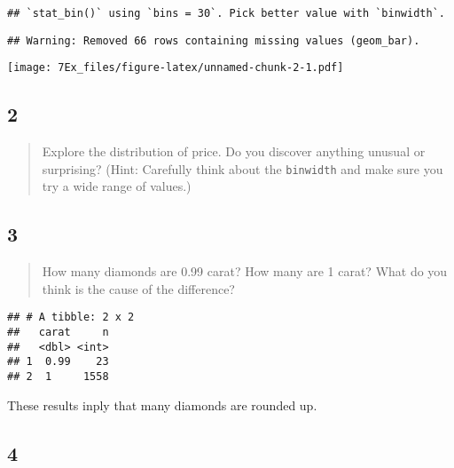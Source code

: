 \documentclass[]{article}
\newenvironment{Shaded}{\begin{snugshade}}{\end{snugshade}}
\newcommand{\DecValTok}[1]{\textcolor[rgb]{0.00,0.00,0.81}{#1}}
\newcommand{\FloatTok}[1]{\textcolor[rgb]{0.00,0.00,0.81}{#1}}
\newcommand{\KeywordTok}[1]{\textcolor[rgb]{0.13,0.29,0.53}{\textbf{#1}}}
\newcommand{\NormalTok}[1]{#1}
\newcommand{\OperatorTok}[1]{\textcolor[rgb]{0.81,0.36,0.00}{\textbf{#1}}}
\newcommand{\StringTok}[1]{\textcolor[rgb]{0.31,0.60,0.02}{#1}}
\begin{document}
\begin{verbatim}
## `stat_bin()` using `bins = 30`. Pick better value with `binwidth`.
\end{verbatim}

\begin{verbatim}
## Warning: Removed 66 rows containing missing values (geom_bar).
\end{verbatim}

\texttt{[image: 7Ex\_files/figure-latex/unnamed-chunk-2-1.pdf]}

\hypertarget{section-2}{%
\subsection{2}\label{section-2}}

\begin{quote}
Explore the distribution of price. Do you discover anything unusual or
surprising? (Hint: Carefully think about the \texttt{binwidth} and make
sure you try a wide range of values.)
\end{quote}

\hypertarget{section-3}{%
\subsection{3}\label{section-3}}

\begin{quote}
How many diamonds are 0.99 carat? How many are 1 carat? What do you
think is the cause of the difference?
\end{quote}

\begin{Shaded}
\end{Shaded}

\begin{verbatim}
## # A tibble: 2 x 2
##   carat     n
##   <dbl> <int>
## 1  0.99    23
## 2  1     1558
\end{verbatim}

These results inply that many diamonds are rounded up.

\hypertarget{section-4}{%
\subsection{4}\label{section-4}}
\end{document}
